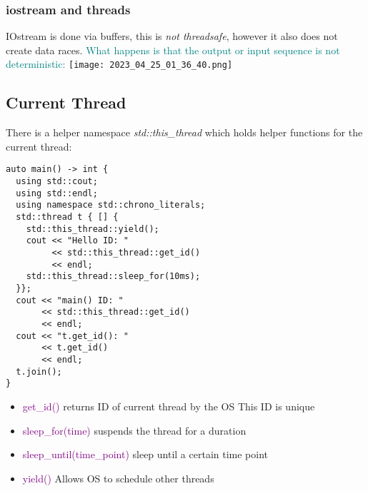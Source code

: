 \documentclass[main.tex,fontsize=8pt,paper=a4,paper=portrait,DIV=calc,]{scrartcl}
\begin{document}
\subsubsection{iostream and threads}
IOstream is done via buffers, this is \emph{not threadsafe}, however it also does not create data races.\newline
\textcolor{teal}{What happens is that the output or input sequence is not deterministic:}\newline
\texttt{[image: 2023\_04\_25\_01\_36\_40.png]}

\subsection{Current Thread}
There is a helper namespace \emph{std::this\_thread} which holds helper functions for the current thread:
\begin{lstlisting}
auto main() -> int {
  using std::cout;
  using std::endl;
  using namespace std::chrono_literals;
  std::thread t { [] {
    std::this_thread::yield();
    cout << "Hello ID: "
         << std::this_thread::get_id()
         << endl;
    std::this_thread::sleep_for(10ms);
  }};
  cout << "main() ID: "
       << std::this_thread::get_id()
       << endl;
  cout << "t.get_id(): "
       << t.get_id()
       << endl;
  t.join();
}
\end{lstlisting}
\begin{itemize}
\item \textcolor{purple}{get\_id()}\newline
  returns ID of current thread by the OS\newline
  This ID is unique
\item \textcolor{purple}{sleep\_for(time)}\newline
  suspends the thread for a duration
\item \textcolor{purple}{sleep\_until(time\_point)}\newline
  sleep until a certain time point
\item \textcolor{purple}{yield()}\newline
  Allows OS to schedule other threads
\end{itemize} 
\end{document}
